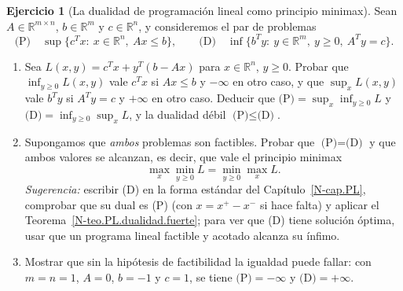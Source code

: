 \documentclass[11pt,a4paper]{amsart}
\newcounter{chapter}
\newcommand{\R}{{\mathbb R}}
\theoremstyle{remark}
\theoremstyle{definition}
\newtheorem{ejercicio}{Ejercicio}[chapter]
\numberwithin{subsection}{section}
\numberwithin{equation}{section}
\begin{document}
\begin{ejercicio}[La dualidad de programación lineal como principio minimax]\label{ejer.PL.minimax}
Sean $A\in\R^{m\times n}$, $b\in\R^m$ y $c\in\R^n$, y consideremos el par de
problemas
\[
\text{(P)}\quad\sup\{c^Tx:\ x\in\R^n,\ Ax\le b\},
\qquad
\text{(D)}\quad\inf\{b^Ty:\ y\in\R^m,\ y\ge0,\ A^Ty=c\}.
\]
\begin{enumerate}[label=(\alph*)]
\item Sea $L(x,y)=c^Tx+y^T(b-Ax)$ para $x\in\R^n$, $y\ge0$. Probar que
$\inf_{y\ge0}L(x,y)$ vale $c^Tx$ si $Ax\le b$ y $-\infty$ en otro caso, y que
$\sup_xL(x,y)$ vale $b^Ty$ si $A^Ty=c$ y $+\infty$ en otro caso. Deducir que
$\text{(P)}=\sup_x\inf_{y\ge0}L$ y $\text{(D)}=\inf_{y\ge0}\sup_xL$, y la
dualidad débil $\text{(P)}\le\text{(D)}$.
\item Supongamos que \emph{ambos} problemas son factibles. Probar que
$\text{(P)}=\text{(D)}$ y que ambos valores se alcanzan, es decir, que vale el
principio minimax
\[
\max_x\min_{y\ge0}L=\min_{y\ge0}\max_xL.
\]
\emph{Sugerencia:} escribir (D) en la forma estándar del
Capítulo~\ref{N-cap.PL}, comprobar que su dual es (P) (con $x=x^+-x^-$ si hace
falta) y aplicar el Teorema~\ref{N-teo.PL.dualidad.fuerte}; para ver que (D)
tiene solución óptima, usar que un programa lineal factible y acotado
alcanza su ínfimo.
\item Mostrar que sin la hipótesis de factibilidad la igualdad puede fallar:
con $m=n=1$, $A=0$, $b=-1$ y $c=1$, se tiene $\text{(P)}=-\infty$ y
$\text{(D)}=+\infty$.
\end{enumerate}
\end{ejercicio}



\end{document}
